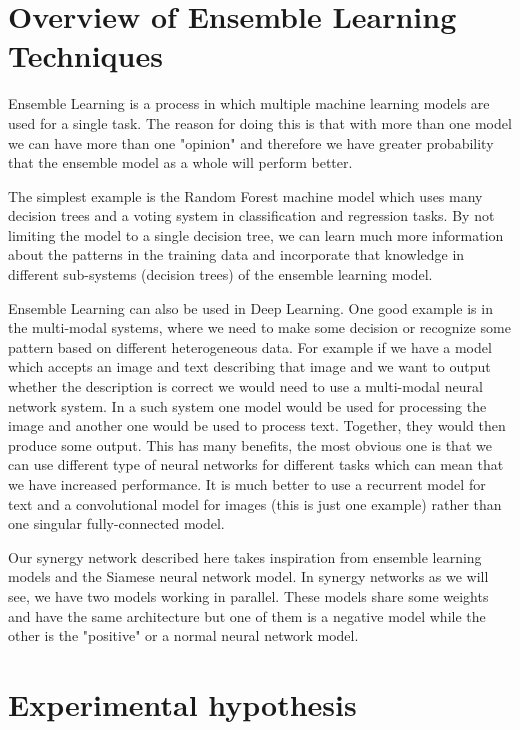 \documentclass[b5paper]{book}
\begin{document}
\chapter{Overview of Ensemble Learning Techniques}

Ensemble Learning is a process in which multiple machine learning models are used for a single task. The reason for doing this is that with more than one model we can have more than one "opinion" and therefore we have greater probability that the ensemble model as a whole will perform better.

The simplest example is the Random Forest machine model which uses many decision trees and a voting system in classification and regression tasks. By not limiting the model to a single decision tree, we can learn much more information about the patterns in the training data and incorporate that knowledge in different sub-systems (decision trees) of the ensemble learning model.

Ensemble Learning can also be used in Deep Learning. One good example is in the multi-modal systems, where we need to make some decision or recognize some pattern based on different heterogeneous data. For example if we have a model which accepts an image and text describing that image and we want to output whether the description is correct we would need to use a multi-modal neural network system. In a such system one model would be used for processing the image and another one would be used to process text. Together, they would then produce some output. This has many benefits, the most obvious one is that we can use different type of neural networks for different tasks which can mean that we have increased performance. It is much better to use a recurrent model for text and a convolutional model for images (this is just one example) rather than one singular fully-connected model.

Our synergy network described here takes inspiration from ensemble learning models and the Siamese neural network model. In synergy networks as we will see, we have two models working in parallel. These models share some weights and have the same architecture but one of them is a negative model while the other is the "positive" or a normal neural network model.


\chapter{Experimental hypothesis}
\end{document}
